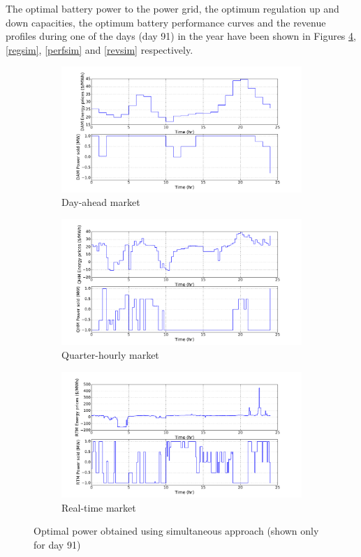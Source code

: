 \documentclass[11pt,twoside]{article}
\begin{document}
The optimal battery power to the power grid, the optimum regulation up and down capacities, the optimum battery performance curves and the revenue profiles during one of the days (day 91) in the year have been shown in Figures \ref{psim}, \ref{regsim}, \ref{perfsim} and \ref{revsim} respectively.
\begin{figure}[h!tp]
\centering
\begin{subfigure}[b]{0.49\textwidth} \includegraphics[width=\textwidth]{Figures/Plots/Simultaneous/DAM_P.pdf} \caption{Day-ahead market}\label{dampsim} \end{subfigure} \hfill
\begin{subfigure}[b]{0.49\textwidth} \includegraphics[width=\textwidth]{Figures/Plots/Simultaneous/QHM_P.pdf} \caption{Quarter-hourly market}\label{qhmpsim} \end{subfigure} \hfill
\begin{subfigure}[b]{0.49\textwidth} \includegraphics[width=\textwidth]{Figures/Plots/Simultaneous/RTM_P.pdf} \caption{Real-time market}\label{rtmpsim}\end{subfigure} \hfill
\caption{Optimal power obtained using simultaneous approach (shown only for day 91)}\label{psim}
\end{figure}
\end{document}
